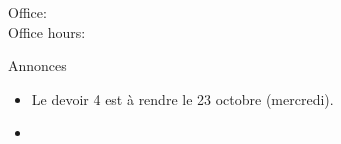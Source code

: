 \documentclass{beamer}
\subtitle[Articles et adverbes]{Les articles de toilette et les adverbes}
\begin{document}
  \begin{frame}
    \titlepage
    \tiny{Office: \\
          Office hours: }
  \end{frame}

  \begin{frame}{Annonces }
    \begin{itemize}
      \item Le devoir 4 est à rendre le 23 octobre (mercredi).
      \item[] 
    \end{itemize}
  \end{frame}

\end{document}
